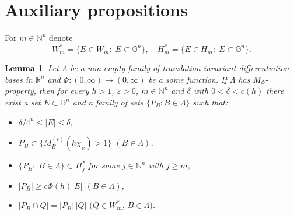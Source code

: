 \documentclass[12pt,reqno]{article}
\newtheorem{lemma}{Lemma}
\theoremstyle{remark}
\begin{document}
\section{Auxiliary propositions}
\label{sec:3}


For $m\in\mathbb{N}^n$ denote
$$  W_m^{*}=\big\{E\in W_m:\;E\subset \mathbb{G}^n\big\}, \quad H_m^{*}=\big\{E\in H_m:\;E\subset \mathbb{G}^n\big\}.       $$

\begin{lemma}\label{lem:1}
Let $\Lambda$ be a non-empty family of translation invariant differentiation bases in $\mathbb{R}^n$ and $\Phi: (0,\infty)\rightarrow (0,\infty)$  be a some function. If $\Lambda$ has $M_\Phi$-\emph{property}, then for every $h>1$, $\varepsilon>0$, $m\in\mathbb{N}^n$ and $\delta$ with $0<\delta<c(h)$ there exist a set $E\subset \mathbb{G}^n$ and a family of sets $\{P_B:B\in\Lambda\}$ such that:
\begin{itemize}
\item[$1)$] $\delta/4^n\leq|E|\leq\delta$,

\item[$2)$] $P_B\subset\{M_B^{(\varepsilon)}(h\chi_{{}_E})>1\}$ $(B\in\Lambda)$,

\item[$3)$] $\{P_B:\;B\in\Lambda\}\subset H_j^{*}$ for some $j\in\mathbb{N}^n$ with $j\geq m$,

\item[$4)$] $|P_B|\geq c\Phi(h)|E|$ $(B\in\Lambda)$,

\item[$5)$] $|P_B\cap Q|=|P_B|\,|Q|$ $(Q\in W_m^{*}$, $B\in\Lambda)$.
\end{itemize}
\end{lemma}
\end{document}
